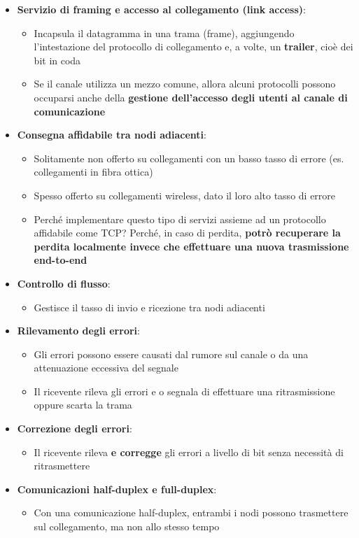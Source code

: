 \documentclass[12pt]{article}
\begin{document}
\begin{itemize}
    \item \textbf{Servizio di framing e accesso al collegamento (link access)}:
    \begin{itemize}
        \item Incapsula il datagramma in una trama (frame), aggiungendo l'intestazione del protocollo di collegamento e, a volte, un \textbf{trailer}, cioè dei bit in coda
        \item Se il canale utilizza un mezzo comune, allora alcuni protocolli possono occuparsi anche della \textbf{gestione dell'accesso degli utenti al canale di comunicazione}
    \end{itemize}
    \item \textbf{Consegna affidabile tra nodi adiacenti}:
    \begin{itemize}
        \item Solitamente non offerto su collegamenti con un basso tasso di errore (es. collegamenti in fibra ottica)
        \item Spesso offerto su collegamenti wireless, dato il loro alto tasso di errore
        \item Perché implementare questo tipo di servizi assieme ad un protocollo affidabile come TCP? Perché, in caso di perdita, \textbf{potrò recuperare la perdita localmente invece che effettuare una nuova trasmissione end-to-end}
    \end{itemize}
    \item \textbf{Controllo di flusso}:
    \begin{itemize}
        \item Gestisce il tasso di invio e ricezione tra nodi adiacenti
    \end{itemize}
    \item \textbf{Rilevamento degli errori}:
    \begin{itemize}
        \item Gli errori possono essere causati dal rumore sul canale o da una attenuazione eccessiva del segnale
        \item Il ricevente rileva gli errori e o segnala di effettuare una ritrasmissione oppure scarta la trama
    \end{itemize}
    \item \textbf{Correzione degli errori}:
    \begin{itemize}
        \item Il ricevente rileva \textbf{e corregge} gli errori a livello di bit senza necessità di ritrasmettere
    \end{itemize}
    \item \textbf{Comunicazioni half-duplex e full-duplex}:
    \begin{itemize}
        \item Con una comunicazione half-duplex, entrambi i nodi possono trasmettere sul collegamento, ma non allo stesso tempo 
    \end{itemize}
\end{itemize}
\end{document}
